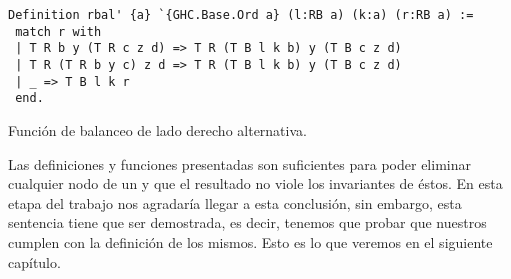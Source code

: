 \begin{listing}[!ht]
\centering
\captionsetup{justification=centering}
\begin{verbatim}
Definition rbal' {a} `{GHC.Base.Ord a} (l:RB a) (k:a) (r:RB a) :=
 match r with
 | T R b y (T R c z d) => T R (T B l k b) y (T B c z d)
 | T R (T R b y c) z d => T R (T B l k b) y (T B c z d)
 | _ => T B l k r
 end.

\end{verbatim}
\caption{Funci\'on de balanceo de lado derecho alternativa.}
\label{rbal_2}
\end{listing}

Las definiciones y funciones presentadas son suficientes para poder eliminar cualquier nodo de un 
{\arn} y que el resultado no viole los invariantes de \'estos. En esta etapa del trabajo nos 
agradar\'ia llegar a esta  conclusi\'on, sin embargo, esta sentencia tiene que ser demostrada, es 
decir, tenemos que probar que nuestros {\arns} cumplen con la  definici\'on de los mismos. Esto es 
lo que veremos en el siguiente cap\'itulo.